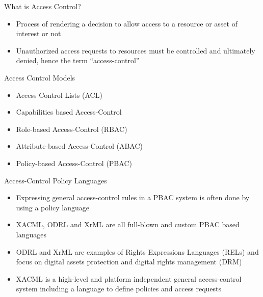 \documentclass{beamer}
\begin{document}
\begin{frame}{What is Access Control?}
\begin{itemize}
   \item Process of rendering a decision to allow access to a resource or asset of interest or not
   \item Unauthorized access requests to resources must be controlled and ultimately denied, hence the term ``access-control''
\end{itemize}
\end{frame}

\begin{frame}{Access Control Models}
\LARGE
\begin{itemize}
   \item Access Control Lists (ACL)
   \item Capabilities based Access-Control 
   \item Role-based Access-Control (RBAC)
   \item Attribute-based Access-Control (ABAC)
   \item Policy-based Access-Control (PBAC)
\end{itemize}
\end{frame}

\begin{frame}{Access-Control Policy Languages}
\begin{itemize}
   \item Expressing general access-control rules in a PBAC system is often done by using a policy language
   \item XACML, ODRL and XrML are all full-blown and custom PBAC based languages 
   \item ODRL and XrML are examples of Rights Expressions Languages (RELs) and focus on digital assets protection and digital rights management (DRM)
   \item XACML is a high-level and platform independent general access-control system including a language to define policies and access requests
\end{itemize}
\end{frame}
\end{document}
